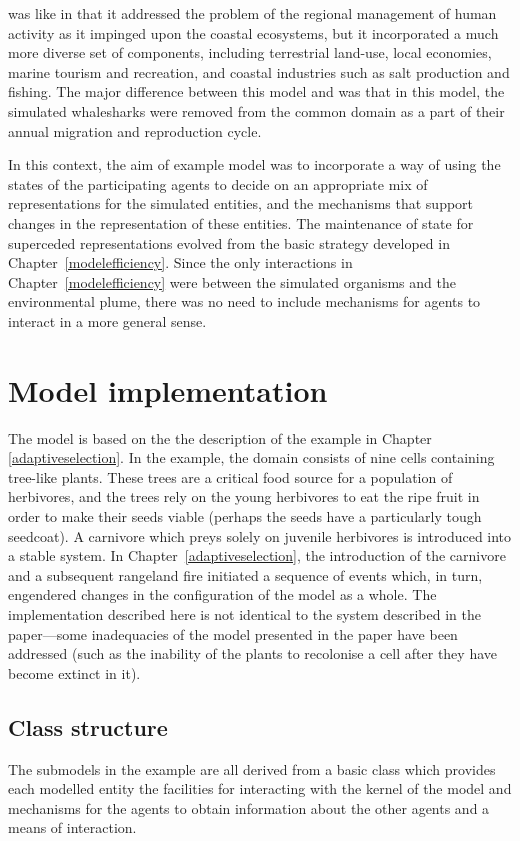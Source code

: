 \cite{gray2014} was like \cite{gray2006nws} in that it addressed the
problem of the regional management of human activity as it impinged
upon the coastal ecosystems, but it incorporated a much more diverse
set of components, including terrestrial land-use, local economies,
marine tourism and recreation, and coastal industries such as salt
production and fishing. The major difference between this model and
\cite{gray2006nws} was that in this model, the simulated whalesharks were
removed from the common domain as a part of their annual migration and
reproduction cycle. 

In this context, the aim of example model was to incorporate a way of
using the states of the participating agents to decide on an
appropriate mix of representations for the simulated entities, and the
mechanisms that support changes in the representation of these
entities. The maintenance of state for superceded representations
evolved from the basic strategy developed in
Chapter~\ref{modelefficiency}.  Since the only interactions in
Chapter~\ref{modelefficiency} were between the simulated organisms and
the environmental plume, there was no need to include mechanisms for
agents to interact in a more general sense.

\section{Model implementation}
The model is based on the the description of the example in Chapter
\ref{adaptiveselection}. In the example, the domain consists of nine
cells containing tree-like plants. These trees are a critical food
source for a population of herbivores, and the trees rely on the young
herbivores to eat the ripe fruit in order to make their seeds viable
(perhaps the seeds have a particularly tough seedcoat). A carnivore
which preys solely on juvenile herbivores is introduced into a stable
system.  In Chapter~\ref{adaptiveselection}, the introduction of the
carnivore and a subsequent rangeland fire initiated a sequence of
events which, in turn, engendered changes in the configuration of the
model as a whole.  The implementation described here is not identical
to the system described in the paper---some inadequacies of the model
presented in the paper have been addressed (such as the inability of
the plants to recolonise a cell after they have become extinct in it).

\subsection{Class structure}
The submodels in the example are all derived from a basic
 class which provides each modelled entity the
facilities for interacting with the kernel of the model and mechanisms
for the agents to obtain information about the other agents and a
means of interaction.

